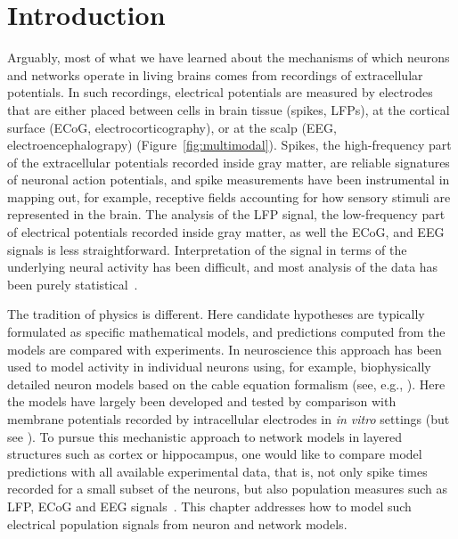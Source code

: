 \documentclass[preprint,11pt,authoryear]{elsarticle}
\begin{document}
\tableofcontents

\linenumbers

\section{Introduction}
\label{sec:introduction}

Arguably, most of what we have learned about the mechanisms of which neurons and networks operate in living brains comes from recordings of 
extracellular potentials. In such recordings, electrical potentials are measured by electrodes that are either placed between cells in brain tissue (spikes, LFPs), at the cortical surface (ECoG, electrocorticography), or at the scalp (EEG, electroencephalograpy) (Figure~\ref{fig:multimodal}). Spikes, the high-frequency part of the extracellular potentials recorded inside gray matter, are reliable signatures of neuronal action potentials, and spike measurements have been instrumental in mapping out, for example, receptive fields accounting for how sensory stimuli are represented in the brain. The analysis of the LFP signal, the low-frequency part of electrical potentials recorded inside gray matter, as well the ECoG, and EEG signals is less straightforward. Interpretation of the signal in terms of the underlying neural activity has been difficult, and most analysis of the data has been purely statistical~\citep{Nunez2006,Buzsaki2012,Einevoll2013,Ilmoniemi2019}.

The tradition of physics is different. Here candidate hypotheses are typically formulated as specific mathematical models, and predictions computed from the models are compared with experiments. In neuroscience this approach has been used to model activity in individual neurons using, for example, biophysically detailed neuron models based on the cable equation formalism (see, e.g., \citet{Koch1999,Sterratt2011}).  
Here the models have largely been developed and tested by comparison with membrane potentials recorded by intracellular electrodes in 
\emph{in vitro} settings (but see \citet{Gold2007}).
To pursue this mechanistic approach to network models in layered structures such as cortex or hippocampus, 
one would like to compare model predictions with all available experimental data, that is, not only spike times recorded for a small subset of the neurons, but also population measures such as LFP, ECoG and EEG signals~\citep{Einevoll2019}. This chapter addresses how to model such electrical population signals from neuron and network models.
\end{document}
